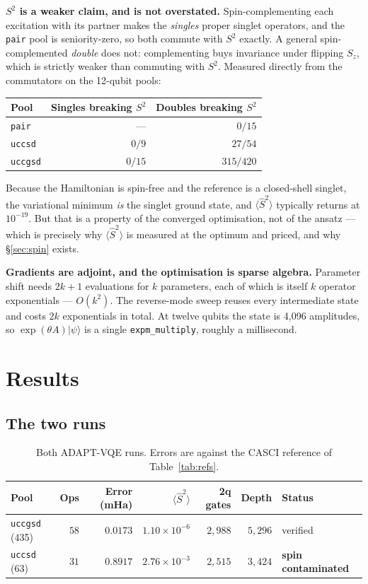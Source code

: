 \documentclass[11pt,a4paper]{article}
\newcommand{\Ssq}{\ensuremath{\langle \hat{S}^2 \rangle}}
\newcommand{\code}[1]{\texttt{\small #1}}
\begin{document}
\textbf{$S^2$ is a weaker claim, and is not overstated.} Spin-complementing each
excitation with its partner makes the \emph{singles} proper singlet operators,
and the \code{pair} pool is seniority-zero, so both commute with $S^2$ exactly.
A general spin-complemented \emph{double} does not: complementing buys
invariance under flipping $S_z$, which is strictly weaker than commuting with
$S^2$. Measured directly from the commutators on the 12-qubit pools:

\begin{center}
\small
\begin{tabular}{lrr}
\toprule
Pool & Singles breaking $S^2$ & Doubles breaking $S^2$ \\
\midrule
\code{pair}   & ---     & $0/15$ \\
\code{uccsd}  & $0/9$   & $27/54$ \\
\code{uccgsd} & $0/15$  & $315/420$ \\
\bottomrule
\end{tabular}
\end{center}

Because the Hamiltonian is spin-free and the reference is a closed-shell
singlet, the variational minimum \emph{is} the singlet ground state, and $\Ssq$
typically returns at $10^{-19}$. But that is a property of the converged
optimisation, not of the ansatz --- which is precisely why $\Ssq$ is measured at
the optimum and priced, and why \S\ref{sec:spin} exists.

\textbf{Gradients are adjoint, and the optimisation is sparse algebra.}
Parameter shift needs $2k+1$ evaluations for $k$ parameters, each of which is
itself $k$ operator exponentials --- $O(k^2)$. The reverse-mode sweep reuses
every intermediate state and costs $2k$ exponentials in total. At twelve qubits
the state is 4{,}096 amplitudes, so $\exp(\theta A)|\psi\rangle$ is a single
\code{expm\_multiply}, roughly a millisecond.

\section{Results}

\subsection{The two runs}

\begin{table}[htbp]
\centering
\caption{Both ADAPT-VQE runs. Errors are against the CASCI reference of
Table~\ref{tab:refs}.}
\label{tab:runs}
\small
\begin{tabular}{lrrrrrl}
\toprule
Pool & Ops & Error (mHa) & $\Ssq$ & 2q gates & Depth & Status \\
\midrule
\code{uccgsd} (435) & $58$ & $\mathbf{0.0173}$ & $1.10\times10^{-6}$ & $2{,}988$ & $5{,}296$ & verified \\
\code{uccsd} (63)   & $31$ & $0.8917$          & $2.76\times10^{-3}$ & $2{,}515$ & $3{,}424$ & \textbf{spin contaminated} \\
\bottomrule
\end{tabular}
\end{table}
\end{document}
